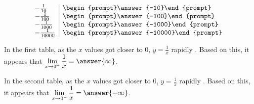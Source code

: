 \documentclass{ximera}
\begin{document}
\begin{problem}
\[\begin{array}{l|l}
    -\frac{1}{10}  & \begin{prompt}\answer{-10}\end{prompt}\\
    -\frac{1}{100} & \begin{prompt}\answer{-100}\end{prompt} \\
    -\frac{1}{1000} & \begin{prompt}\answer{-1000}\end{prompt} \\
    -\frac{1}{10000} & \begin{prompt}\answer{-10000}\end{prompt} \\
  \end{array}
  \]
  
In the first table, as the $x$ values got closer to $0$, $y = \frac{1}{x}$ rapidly .  Based on this, it appears that $\displaystyle\lim_{x \to 0^+} \frac{1}{x} = \answer{\infty}$.

In the second table, as the $x$ values got closer to $0$, $y = \frac{1}{x}$ rapidly .  Based on this, it appears that $\displaystyle\lim_{x \to 0^-} \frac{1}{x} = \answer{-\infty}$.

\end{problem}


%
\end{document}
